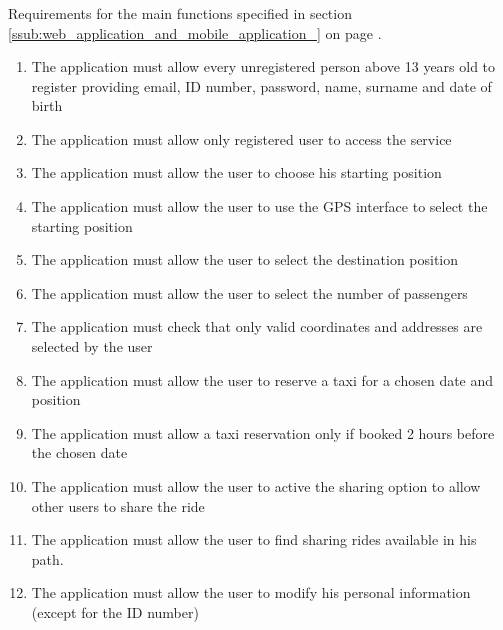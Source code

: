 \subsubsection{}
Requirements for the main functions specified in section \ref{ssub:web_application_and_mobile_application_} on page \pageref{ssub:web_application_and_mobile_application_}.
\begin{enumerate}[resume*]
	\item The application must allow every unregistered person above 13 years old to register providing email, ID number, password, name, surname and date of birth
	\item The application must allow only registered user to access the service
	\item The application must allow the user to choose his starting position
	\item The application must allow the user to use the GPS interface to select the starting position
	\item The application must allow the user to select the destination position
	\item The application must allow the user to select the number of passengers
	\item The application must check that only valid coordinates and addresses  are selected by the user
	\item The application must allow the user to reserve a taxi for a chosen  date and position
	\item The application must allow a taxi reservation only if booked 2 hours before the chosen date
	\item The application must allow the user to active the sharing option to allow other users to share the ride
	\item The application must allow the user to find sharing rides available in his path. 
	\item The application must allow the user to modify his personal information (except for the ID number)
\end{enumerate}


